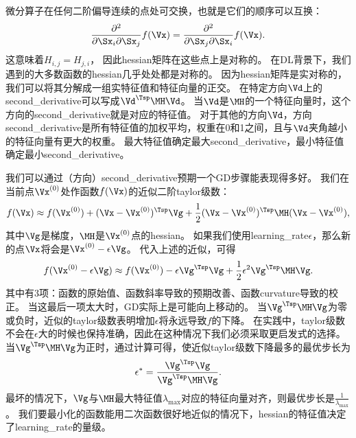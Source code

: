 
微分算子在任何二阶偏导连续的点处可交换，也就是它们的顺序可以互换：
\begin{align}
 \frac{\partial^2}{\partial \Sx_i \partial \Sx_j} f(\Vx) = \frac{\partial^2}{\partial \Sx_j\partial \Sx_i} f(\Vx) .
\end{align}
这意味着$H_{i,j} = H_{j,i}$， 因此\gls{hessian}矩阵在这些点上是对称的。
在\gls{DL}背景下，我们遇到的大多数函数的\gls{hessian}几乎处处都是对称的。
因为\gls{hessian}矩阵是实对称的，我们可以将其分解成一组实特征值和特征向量的正交。
在特定方向$\Vd$上的\gls{second_derivative}可以写成$\Vd^\Tsp \MH \Vd$。
当$\Vd$是$\MH$的一个特征向量时，这个方向的\gls{second_derivative}就是对应的特征值。
对于其他的方向$\Vd$，方向\gls{second_derivative}是所有特征值的加权平均，权重在0和1之间，且与$\Vd$夹角越小的特征向量有更大的权重。
最大特征值确定最大\gls{second_derivative}，最小特征值确定最小\gls{second_derivative}。


我们可以通过（方向）\gls{second_derivative}预期一个\gls{GD}步骤能表现得多好。
我们在当前点$\Vx^{(0)}$处作函数$f(\Vx)$的近似二阶\gls{taylor}级数：
\begin{align}
 f(\Vx) \approx f(\Vx^{(0)}) + (\Vx - \Vx^{(0)})^\Tsp \Vg + 
 \frac{1}{2}  (\Vx - \Vx^{(0)})^\Tsp \MH  (\Vx - \Vx^{(0)}),
\end{align}
其中$\Vg$是梯度，$\MH$是$ \Vx^{(0)}$点的\gls{hessian}。
如果我们使用\gls{learning_rate}$\epsilon$，那么新的点$\Vx$将会是$\Vx^{(0)}-\epsilon \Vg$。
代入上述的近似，可得
\begin{align}
\label{eq:4.9}
 f(\Vx^{(0)} - \epsilon \Vg ) \approx f(\Vx^{(0)})  - \epsilon \Vg^\Tsp \Vg + \frac{1}{2} \epsilon^2 \Vg^\Tsp \MH  \Vg.
\end{align}
其中有3项：函数的原始值、函数斜率导致的预期改善、函数\gls{curvature}导致的校正。
当这最后一项太大时，\gls{GD}实际上是可能向上移动的。
当$\Vg^\Tsp \MH  \Vg$为零或负时，近似的\gls{taylor}级数表明增加$\epsilon$将永远导致$f$的下降。
在实践中，\gls{taylor}级数不会在$\epsilon$大的时候也保持准确，因此在这种情况下我们必须采取更启发式的选择。
当$\Vg^\Tsp \MH  \Vg$为正时，通过计算可得，使近似\gls{taylor}级数下降最多的最优步长为
\begin{align}
 \epsilon^* = \frac{ \Vg^\Tsp \Vg}{ \Vg^\Tsp \MH  \Vg} .
\end{align}
最坏的情况下，$\Vg$与$\MH$最大特征值$\lambda_{\max}$对应的特征向量对齐，则最优步长是$\frac{1}{\lambda_{\max}}$。
我们要最小化的函数能用二次函数很好地近似的情况下，\gls{hessian}的特征值决定了\gls{learning_rate}的量级。

